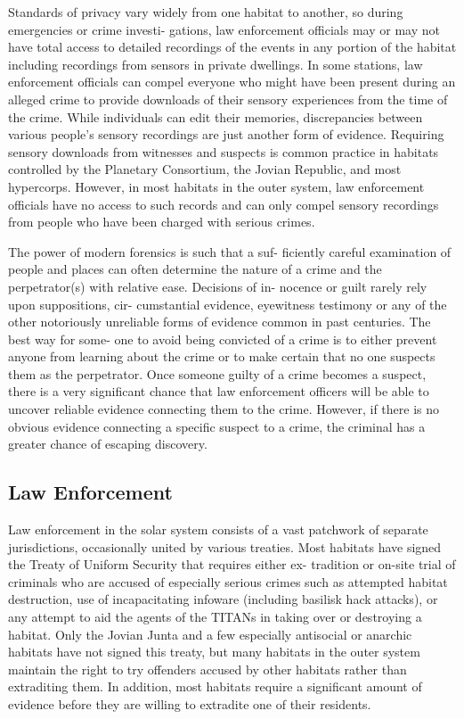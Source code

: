 Standards of privacy vary widely from one habitat 
to another, so during emergencies or crime investi-
gations, law enforcement officials may or may not 
have total access to detailed recordings of the events 
in any portion of the habitat including recordings 
from sensors in private dwellings. In some stations, 
law enforcement officials can compel everyone who 
might have been present during an alleged crime to 
provide downloads of their sensory experiences from 
the time of the crime. While individuals can edit their 
memories, discrepancies between various people's 
sensory recordings are just another form of evidence. 
Requiring sensory downloads from witnesses and 
suspects is common practice in habitats controlled 
by the Planetary Consortium, the Jovian Republic, 
and most hypercorps. However, in most habitats in 
the outer system, law enforcement officials have no 
access to such records and can only compel sensory 
recordings from people who have been charged with 
serious crimes.

The power of modern forensics is such that a suf-
ficiently careful examination of people and places 
can often determine the nature of a crime and the 
perpetrator(s) with relative ease. Decisions of in-
nocence or guilt rarely rely upon suppositions, cir-
cumstantial evidence, eyewitness testimony or any of 
the other notoriously unreliable forms of evidence 
common in past centuries. The best way for some-
one to avoid being convicted of a crime is to either 
prevent anyone from learning about the crime or 
to make certain that no one suspects them as the 
perpetrator. Once someone guilty of a crime becomes 
a suspect, there is a very significant chance that law 
enforcement officers will be able to uncover reliable 
evidence connecting them to the crime. However, if 
there is no obvious evidence connecting a specific 
suspect to a crime, the criminal has a greater chance 
of escaping discovery.

\subsection{Law Enforcement}

Law enforcement in the solar system consists of a 
vast patchwork of separate jurisdictions, occasionally 
united by various treaties. Most habitats have signed 
the Treaty of Uniform Security that requires either ex-
tradition or on-site trial of criminals who are accused 
of especially serious crimes such as attempted habitat 
destruction, use of incapacitating infoware (including 
basilisk hack attacks), or any attempt to aid the agents 
of the TITANs in taking over or destroying a habitat. 
Only the Jovian Junta and a few especially antisocial 
or anarchic habitats have not signed this treaty, but 
many habitats in the outer system maintain the right 
to try offenders accused by other habitats rather than 
extraditing them. In addition, most habitats require a 
significant amount of evidence before they are willing 
to extradite one of their residents.

